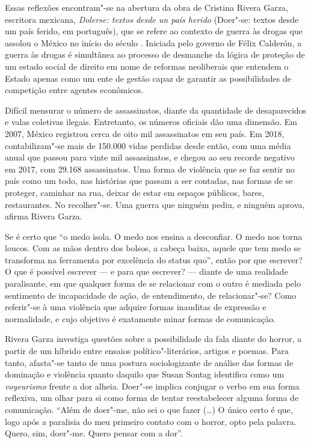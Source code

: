 Essas reflexões encontram"-se na abertura da obra de Cristina Rivera
Garza, escritora mexicana, \emph{Dolerse: textos desde un país herido}
(Doer"-se: textos desde um país ferido, em português), que se refere ao
contexto de guerra às drogas que assolou o México no início do século
. Iniciada pelo governo de Félix Calderón, a guerra às drogas é
simultânea ao processo de desmanche da lógica de proteção de um estado
social de direito em nome de reformas neoliberais que entendem o Estado
apenas como um ente de gestão capaz de garantir as possibilidades de
competição entre agentes econômicos.

Difícil mensurar o número de assassinatos, diante da quantidade de
desaparecidos e valas coletivas ilegais. Entretanto, os números oficiais
dão uma dimensão. Em 2007, México registrou cerca de oito mil
assassinatos em seu país. Em 2018, contabilizam"-se mais de 150.000 vidas
perdidas desde então, com uma média anual que passou para vinte mil
assassinatos, e chegou ao seu recorde negativo em 2017, com 29.168
assassinatos. Uma forma de violência que se faz sentir no país como um
todo, nas histórias que passam a ser contadas, nas formas de se
proteger, caminhar na rua, deixar de estar em espaços públicos, bares,
restaurantes. No recolher"-se. Uma guerra que ninguém pediu, e ninguém
aprova, afirma Rivera Garza.

Se é certo que ``o medo isola. O medo nos ensina a desconfiar. O medo
nos torna loucos. Com as mãos dentro dos bolsos, a cabeça baixa, aquele
que tem medo se transforma na ferramenta por excelência do status quo'',
então por que escrever? O que é possível escrever --- e para que
escrever? --- diante de uma realidade paralisante, em que qualquer forma
de se relacionar com o outro é mediada pelo sentimento de incapacidade
de ação, de entendimento, de relacionar"-se? Como referir"-se à uma
violência que adquire formas inauditas de expressão e normalidade, e
cujo objetivo é exatamente minar formas de comunicação.

Rivera Garza investiga questões sobre a possibilidade da fala diante do
horror, a partir de um híbrido entre ensaios político"-literários,
artigos e poemas. Para tanto, afasta"-se tanto de uma postura
sociologizante de análise das formas de dominação e violência quanto
daquilo que Susan Sontag identifica como um \emph{voyeurismo} frente a dor
alheia. Doer"-se implica conjugar o verbo em sua forma reflexiva, um
olhar para si como forma de tentar reestabelecer alguma forma de
comunicação. ``Além de doer"-me, não sei o que fazer (\ldots{}) O único
certo é que, logo após a paralisia do meu primeiro contato com o horror,
opto pela palavra. Quero, sim, doer"-me. Quero pensar com a dor''.

